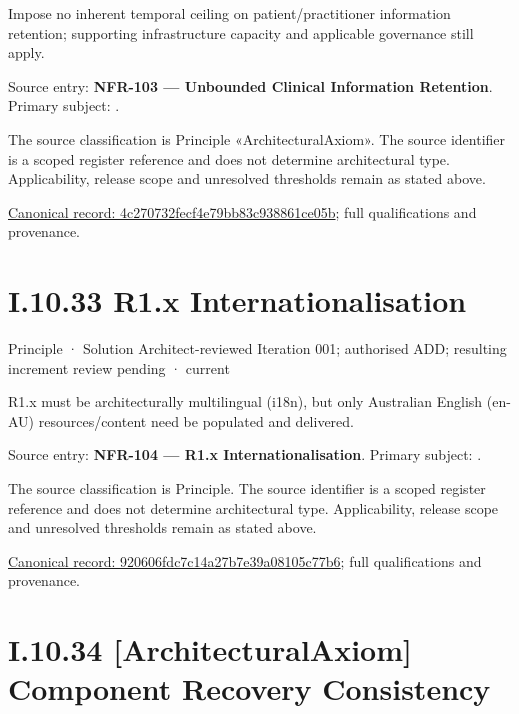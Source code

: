 Impose no inherent temporal ceiling on patient/practitioner information retention; supporting infrastructure capacity and applicable governance still apply.



Source entry: \textbf{NFR-103 — Unbounded Clinical Information Retention}. Primary subject: \texttt{}.



The source classification is Principle «ArchitecturalAxiom». The source identifier is a scoped register reference and does not determine architectural type. Applicability, release scope and unresolved thresholds remain as stated above.


{\footnotesize \href{../../../../../../../continuum/motivation/principle/architectural-axiom/4c270732fecf4e79bb83c938861ce05b.md}{Canonical record: 4c270732fecf4e79bb83c938861ce05b}; full qualifications and provenance.}\par
\section*{I.10.33 R1.x Internationalisation}
\label{navigation:I.10.33}

\label{element:920606fdc7c14a27b7e39a08105c77b6}
{\small Principle · Solution Architect-reviewed Iteration 001; authorised ADD; resulting increment review pending · current}\par

R1.x must be architecturally multilingual (i18n), but only Australian English (en-AU) resources/content need be populated and delivered.



Source entry: \textbf{NFR-104 — R1.x Internationalisation}. Primary subject: \texttt{}.



The source classification is Principle. The source identifier is a scoped register reference and does not determine architectural type. Applicability, release scope and unresolved thresholds remain as stated above.


{\footnotesize \href{../../../../../../../continuum/motivation/principle/920606fdc7c14a27b7e39a08105c77b6.md}{Canonical record: 920606fdc7c14a27b7e39a08105c77b6}; full qualifications and provenance.}\par
\section*{I.10.34 [ArchitecturalAxiom] Component Recovery Consistency}
\label{navigation:I.10.34}

